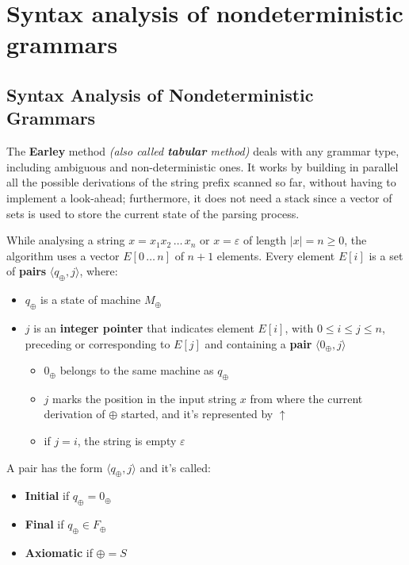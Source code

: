 \section{Syntax analysis of nondeterministic grammars}
\subsection{Syntax Analysis of Nondeterministic Grammars}

The \textbf{Earley} method \textit{(also called \textbf{tabular} method)} deals with any grammar type, including ambiguous and non-deterministic ones.
It works by building in parallel all the possible derivations of the string prefix scanned so far, without having to implement a look-ahead;
furthermore, it does not need a stack since a vector of sets is used to store the current state of the parsing process.

\bigskip
While analysing a string \(x = x_1 x_2 \,\ldots\, x_n\) or \(x = \varepsilon\) of length \(|x| = n \geq 0\), the algorithm uses a vector \(E\left[ 0 \,\ldots\, n \right]\) of \(n+1\) elements.
Every element \(E[i]\) is a set of \textbf{pairs} \(\langle q_\oplus, j\rangle\), where:

\begin{itemize}
  \item \(q_\oplus\) is a state of machine \(M_\oplus\)
  \item \(j\) is an \textbf{integer pointer} that indicates element \(E[i]\), with \(0 \leq i \leq j \leq n\), preceding or corresponding to \(E[j]\) and containing a \textbf{pair} \(\langle 0_\oplus, j \rangle\)
        \begin{itemize}
          \item \(0_\oplus\) belongs to the same machine as \(q_\oplus\)
          \item \(j\) marks the position in the input string \(x\) from where the current derivation of \(\oplus\) started, and it's represented by \(\uparrow\)
          \item if \(j = i\), the string is empty \(\varepsilon\)
        \end{itemize}
\end{itemize}

A pair has the form \(\langle q_\oplus, j \rangle\) and it's called:
\begin{itemize}
  \item \textbf{Initial} if \(q_\oplus = 0_\oplus\)
  \item \textbf{Final} if \(q_\oplus \in F_\oplus\)
  \item \textbf{Axiomatic} if \(\oplus = S\)
\end{itemize}


